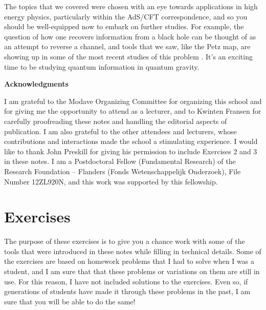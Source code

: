 \documentclass[a4paper,11pt]{article}
\begin{document}
The topics that we covered were chosen with an eye towards applications in high energy physics, particularly within the AdS/CFT correspondence, and so you should be well-equipped now to embark on further studies.
For example, the question of how one recovers information from a black hole can be thought of as an attempt to reverse a channel, and tools that we saw, like the Petz map, are showing up in some of the most recent studies of this problem \cite{Almheiri:2020cfm}.
It's an exciting time to be studying quantum information in quantum gravity.

\newpage
\begin{center} 
{\bf Acknowledgments}
\end{center}
\noindent 
I am grateful to the Modave Organizing Committee for organizing this school and for giving me the opportunity to attend as a lecturer, and to Kwinten Fransen for carefully proofreading these notes and handling the editorial aspects of publication.
I am also grateful to the other attendees and lecturers, whose contributions and interactions made the school a stimulating experience.
I would like to thank John Preskill for giving his permission to include Exercises 2 and 3 in these notes.
I am a Postdoctoral Fellow (Fundamental Research) of the Research Foundation -- Flanders (Fonds Wetenschappelijk Onderzoek), File Number 12ZL920N, and this work was supported by this fellowship.
\newpage

\section{Exercises}
\label{sec:exercises}

The purpose of these exercises is to give you a chance work with some of the tools that were introduced in these notes while filling in technical details.
Some of the exercises are based on homework problems that I had to solve when I was a student, and I am sure that that these problems or variations on them are still in use.
For this reason, I have not included solutions to the exercises.
Even so, if generations of students have made it through these problems in the past, I am sure that you will be able to do the same!

~

\end{document}
